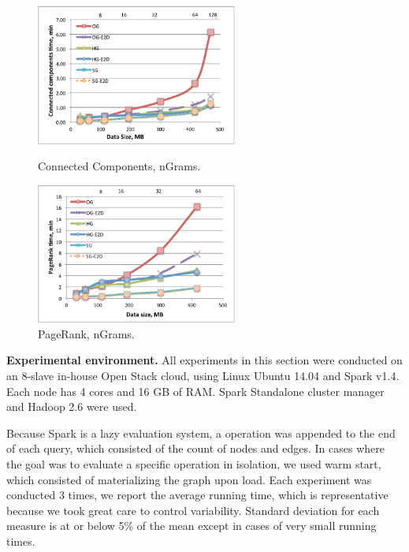\begin{figure}[t]
\centering
\begin{minipage}{3in}
  \centering
  \includegraphics[width=2.6in]{figs/connectedcs_ngrams.pdf}
  \vspace{-0.1in}
  \caption{Connected Components, nGrams.}
  \label{fig:connectc_ngrams}
  \vspace{-0.5cm}
\end{minipage}
\begin{minipage}{3in}
  \centering
\includegraphics[width=2.6in]{figs/pagerank_ngrams.pdf}
  \vspace{-0.1in}
\caption{PageRank, nGrams.}
\label{fig:pagerank_ngrams}
  \vspace{-0.5cm}
\end{minipage}
\end{figure}

{\bf Experimental environment.} All experiments in this section were
conducted on an 8-slave in-house Open Stack cloud, using Linux Ubuntu
14.04 and Spark v1.4.  Each node has 4 cores and 16 GB of RAM.  Spark
Standalone cluster manager and Hadoop 2.6 were used.

Because Spark is a lazy evaluation system, a 
operation was appended to the end of each query, which consisted of
the count of nodes and edges.  In cases where the goal was to evaluate
a specific operation in isolation, we used warm start, which consisted
of materializing the graph upon load.  Each experiment was conducted 3
times, we report the average running time, which is representative
because we took great care to control variability.  Standard deviation
for each measure is at or below 5\% of the mean except in cases of
very small running times.

